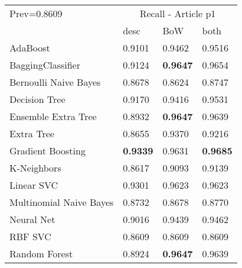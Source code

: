 \begin{tabular}{|l|l|l|l| }
\hline
Prev=0.8609 &  \multicolumn{3}{c|}{Recall - Article p1} \\
\cline{2-4} & desc & BoW & both \\ \hline
AdaBoost                & 0.9101 & 0.9462 & 0.9516\\
BaggingClassifier       & 0.9124 & {\bf 0.9647} & 0.9654\\
Bernoulli Naive Bayes   & 0.8678 & 0.8624 & 0.8747\\
Decision Tree           & 0.9170 & 0.9416 & 0.9531\\
Ensemble Extra Tree     & 0.8932 & {\bf 0.9647} & 0.9639\\
Extra Tree              & 0.8655 & 0.9370 & 0.9216\\
Gradient Boosting       & {\bf 0.9339} & 0.9631 & {\bf 0.9685}\\
K-Neighbors             & 0.8617 & 0.9093 & 0.9139\\
Linear SVC              & 0.9301 & 0.9623 & 0.9623\\
Multinomial Naive Bayes & 0.8732 & 0.8678 & 0.8770\\
Neural Net              & 0.9016 & 0.9439 & 0.9462\\
RBF SVC                 & 0.8609 & 0.8609 & 0.8609\\
Random Forest           & 0.8924 & {\bf 0.9647} & 0.9639\\
\hline
\end{tabular}